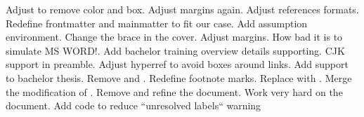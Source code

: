 \markdownRendererUlItem Adjust  to remove color and box.\markdownRendererUlItemEnd 
\markdownRendererUlItem Adjust margins again.\markdownRendererUlItemEnd 
\markdownRendererUlItem Adjust references formats.\markdownRendererUlItemEnd 
\markdownRendererUlItem Redefine frontmatter and mainmatter to fit our case.\markdownRendererUlItemEnd 
\markdownRendererUlItem Add assumption environment.\markdownRendererUlItemEnd 
\markdownRendererUlItem Change the brace in the cover.\markdownRendererUlItemEnd 
\markdownRendererUlEnd \markdownRendererInterblockSeparator
{}\markdownRendererInterblockSeparator
{}\markdownRendererInterblockSeparator
{}\markdownRendererUlBegin
\markdownRendererUlItem Adjust margins. How bad it is to simulate MS WORD!.\markdownRendererUlItemEnd 
\markdownRendererUlItem Add bachelor training overview details supporting.\markdownRendererUlItemEnd 
\markdownRendererUlItem CJK support in preamble.\markdownRendererUlItemEnd 
\markdownRendererUlItem Adjust hyperref to avoid boxes around links.\markdownRendererUlItemEnd 
\markdownRendererUlEnd \markdownRendererInterblockSeparator
{}\markdownRendererInterblockSeparator
{}\markdownRendererInterblockSeparator
{}\markdownRendererUlBegin
\markdownRendererUlItem Add support to bachelor thesis.\markdownRendererUlItemEnd 
\markdownRendererUlItem Remove  and .\markdownRendererUlItemEnd 
\markdownRendererUlItem Redefine footnote marks.\markdownRendererUlItemEnd 
\markdownRendererUlItem Replace  with .\markdownRendererUlItemEnd 
\markdownRendererUlItem Merge the modification of .\markdownRendererUlItemEnd 
\markdownRendererUlItem Remove  and refine the document.\markdownRendererUlItemEnd 
\markdownRendererUlItem Work very hard on the document.\markdownRendererUlItemEnd 
\markdownRendererUlItem Add  code to reduce “unresolved labels“ warning\markdownRendererUlItemEnd 
